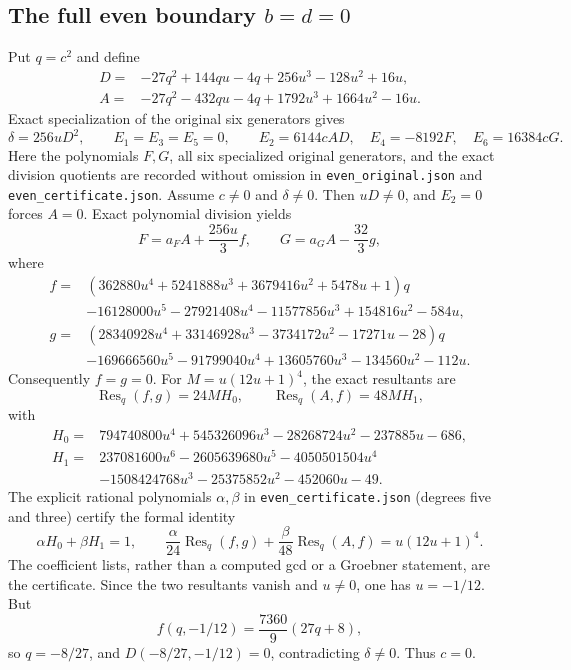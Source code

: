 \documentclass[11pt,a4paper]{article}
\theoremstyle{remark}
\begin{document}
\subsection{The full even boundary \texorpdfstring{\(b=d=0\)}{b=d=0}}
Put \(q=c^2\) and define
\begin{align*}
 D={}&-27q^2+144qu-4q+256u^3-128u^2+16u,\\
 A={}&-27q^2-432qu-4q+1792u^3+1664u^2-16u.
\end{align*}
Exact specialization of the original six generators gives
\[
 \delta=256uD^2,\qquad E_1=E_3=E_5=0,\qquad
 E_2=6144cAD,\quad E_4=-8192F,\quad E_6=16384cG.
\]
Here the polynomials \(F,G\), all six specialized original generators,
and the exact division quotients are recorded without omission in
\texttt{even\_original.json} and \texttt{even\_certificate.json}.
Assume \(c\ne0\) and \(\delta\ne0\). Then \(uD\ne0\), and \(E_2=0\)
forces \(A=0\). Exact polynomial division yields
\[
 F=a_FA+\frac{256u}{3}f,\qquad
 G=a_GA-\frac{32}{3}g,
\]
where
\begin{align*}
 f={}&(362880u^4+5241888u^3+3679416u^2+5478u+1)q\\
    &-16128000u^5-27921408u^4-11577856u^3+154816u^2-584u,\\
 g={}&(28340928u^4+33146928u^3-3734172u^2-17271u-28)q\\
    &-169666560u^5-91799040u^4+13605760u^3-134560u^2-112u.
\end{align*}
Consequently \(f=g=0\). For \(M=u(12u+1)^4\), the exact resultants are
\[
 \operatorname{Res}_q(f,g)=24M H_0,\qquad
 \operatorname{Res}_q(A,f)=48M H_1,
\]
with
\begin{align*}
 H_0={}&794740800u^4+545326096u^3-28268724u^2-237885u-686,\\
 H_1={}&237081600u^6-2605639680u^5-4050501504u^4\\
       &-1508424768u^3-25375852u^2-452060u-49.
\end{align*}
The explicit rational polynomials
\(\alpha,\beta\) in \texttt{even\_certificate.json}
(degrees five and three) certify the formal identity
\[
 \alpha H_0+\beta H_1=1,\qquad
 \frac{\alpha}{24}\operatorname{Res}_q(f,g)
 +\frac{\beta}{48}\operatorname{Res}_q(A,f)=u(12u+1)^4.
\]
The coefficient lists, rather than a computed gcd or a Groebner
statement, are the certificate. Since the two resultants vanish and
\(u\ne0\), one has \(u=-1/12\). But
\[
 f(q,-1/12)=\frac{7360}{9}(27q+8),
\]
so \(q=-8/27\), and \(D(-8/27,-1/12)=0\), contradicting
\(\delta\ne0\). Thus \(c=0\).
\end{document}
